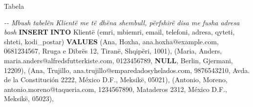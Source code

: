 \documentclass[
  ignorenonframetext,
]{beamer}
\newenvironment{Shaded}{\begin{snugshade}}{\end{snugshade}}
\newcommand{\CommentTok}[1]{\textcolor[rgb]{0.56,0.35,0.01}{\textit{#1}}}
\newcommand{\KeywordTok}[1]{\textcolor[rgb]{0.13,0.29,0.53}{\textbf{#1}}}
\newcommand{\NormalTok}[1]{#1}
\newcommand{\StringTok}[1]{\textcolor[rgb]{0.31,0.60,0.02}{#1}}
\begin{document}
\begin{frame}[fragile]{Tabela}
\label{tabela-1}

\begin{Shaded}
\begin{Highlighting}[]

\CommentTok{{-}{-} Mbush tabelën Klientë me të dhëna shembull, përfshirë disa me fusha adresa bosh}
\KeywordTok{INSERT} \KeywordTok{INTO}\NormalTok{ Klientë (emri, mbiemri, email, telefoni, adresa, qyteti, shteti, kodi\_postar)}
\KeywordTok{VALUES} 
\NormalTok{(}\StringTok{\textquotesingle{}Ana\textquotesingle{}}\NormalTok{, }\StringTok{\textquotesingle{}Hoxha\textquotesingle{}}\NormalTok{, }\StringTok{\textquotesingle{}ana.hoxha@example.com\textquotesingle{}}\NormalTok{, }\StringTok{\textquotesingle{}0681234567\textquotesingle{}}\NormalTok{, }\StringTok{\textquotesingle{}Rruga e Dibrës 12\textquotesingle{}}\NormalTok{, }\StringTok{\textquotesingle{}Tiranë\textquotesingle{}}\NormalTok{, }\StringTok{\textquotesingle{}Shqipëri\textquotesingle{}}\NormalTok{, }\StringTok{\textquotesingle{}1001\textquotesingle{}}\NormalTok{),}
\NormalTok{(}\StringTok{\textquotesingle{}Maria\textquotesingle{}}\NormalTok{, }\StringTok{\textquotesingle{}Anders\textquotesingle{}}\NormalTok{, }\StringTok{\textquotesingle{}maria.anders@alfredsfutterkiste.com\textquotesingle{}}\NormalTok{, }\StringTok{\textquotesingle{}0123456789\textquotesingle{}}\NormalTok{, }\KeywordTok{NULL}\NormalTok{, }\StringTok{\textquotesingle{}Berlin\textquotesingle{}}\NormalTok{, }\StringTok{\textquotesingle{}Gjermani\textquotesingle{}}\NormalTok{, }\StringTok{\textquotesingle{}12209\textquotesingle{}}\NormalTok{),}
\NormalTok{(}\StringTok{\textquotesingle{}Ana\textquotesingle{}}\NormalTok{, }\StringTok{\textquotesingle{}Trujillo\textquotesingle{}}\NormalTok{, }\StringTok{\textquotesingle{}ana.trujillo@emparedadosyhelados.com\textquotesingle{}}\NormalTok{, }\StringTok{\textquotesingle{}9876543210\textquotesingle{}}\NormalTok{, }\StringTok{\textquotesingle{}Avda. de la Constitución 2222\textquotesingle{}}\NormalTok{, }\StringTok{\textquotesingle{}México D.F.\textquotesingle{}}\NormalTok{, }\StringTok{\textquotesingle{}Meksikë\textquotesingle{}}\NormalTok{, }\StringTok{\textquotesingle{}05021\textquotesingle{}}\NormalTok{),}
\NormalTok{(}\StringTok{\textquotesingle{}Antonio\textquotesingle{}}\NormalTok{, }\StringTok{\textquotesingle{}Moreno\textquotesingle{}}\NormalTok{, }\StringTok{\textquotesingle{}antonio.moreno@taqueria.com\textquotesingle{}}\NormalTok{, }\StringTok{\textquotesingle{}1234567890\textquotesingle{}}\NormalTok{, }\StringTok{\textquotesingle{}Mataderos 2312\textquotesingle{}}\NormalTok{, }\StringTok{\textquotesingle{}México D.F.\textquotesingle{}}\NormalTok{, }\StringTok{\textquotesingle{}Meksikë\textquotesingle{}}\NormalTok{, }\StringTok{\textquotesingle{}05023\textquotesingle{}}\NormalTok{),}

\end{Highlighting}
\end{Shaded}
\end{frame}
\end{document}
